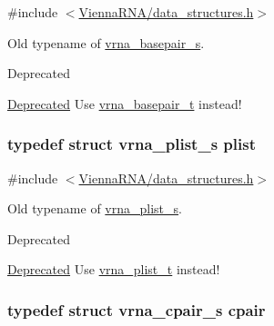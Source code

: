 {\ttfamily \#include $<$\hyperlink{data__structures_8h}{Vienna\-R\-N\-A/data\-\_\-structures.\-h}$>$}



Old typename of \hyperlink{group__data__structures_structvrna__basepair__s}{vrna\-\_\-basepair\-\_\-s}. 

\begin{DoxyRefDesc}{Deprecated}
\item[\hyperlink{deprecated__deprecated000042}{Deprecated}]Use \hyperlink{group__data__structures_gac8c5669d3fb813cacf506489689305ce}{vrna\-\_\-basepair\-\_\-t} instead! \end{DoxyRefDesc}
\hypertarget{group__data__structures_gab1d8894b43aa84cbc50b862a73785fbc}{
\subsubsection[{plist}]{\setlength{\rightskip}{0pt plus 5cm}typedef struct {\bf vrna\-\_\-plist\-\_\-s} {\bf plist}}}\label{group__data__structures_gab1d8894b43aa84cbc50b862a73785fbc}


{\ttfamily \#include $<$\hyperlink{data__structures_8h}{Vienna\-R\-N\-A/data\-\_\-structures.\-h}$>$}



Old typename of \hyperlink{group__data__structures_structvrna__plist__s}{vrna\-\_\-plist\-\_\-s}. 

\begin{DoxyRefDesc}{Deprecated}
\item[\hyperlink{deprecated__deprecated000043}{Deprecated}]Use \hyperlink{group__data__structures_ga8e4eb5e1bfc95776559575beb359af87}{vrna\-\_\-plist\-\_\-t} instead! \end{DoxyRefDesc}
\hypertarget{group__data__structures_ga8412f116a2eb07b59ade9e14ca7c5ef1}{
\subsubsection[{cpair}]{\setlength{\rightskip}{0pt plus 5cm}typedef struct {\bf vrna\-\_\-cpair\-\_\-s} {\bf cpair}}}\label{group__data__structures_ga8412f116a2eb07b59ade9e14ca7c5ef1}


